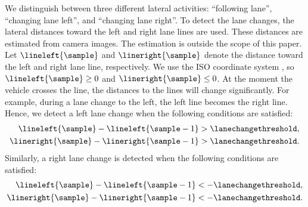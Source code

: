 We distinguish between three different lateral activities: ``following lane'', ``changing lane left'', and ``changing lane right''. 
To detect the lane changes, the lateral distances toward the left and right lane lines are used. 
These distances are estimated from camera images. 
The estimation is outside the scope of this paper. 
Let $\lineleft{\sample}$ and $\lineright{\sample}$ denote the distance toward the left and right lane line, respectively. 
\cstarta We use the ISO coordinate system \autocite{iso8855}, so $\lineleft{\sample} \geq 0$ and $\lineright{\sample} \leq 0$. At the moment the vehicle crosses the line, the distances to the lines will change significantly. For example, during a lane change to the left, the left line becomes the right line. Hence, we detect a left lane change when the following conditions are satisfied:
\begin{align}
	\lineleft{\sample} - \lineleft{\sample-1} &> \lanechangethreshold, \label{eq:potential left a} \\
	\lineright{\sample} - \lineright{\sample-1} &> \lanechangethreshold. \label{eq:potential left b}
\end{align}
Similarly, a right lane change is detected when the following conditions are satisfied:
\begin{align}
	\lineleft{\sample} - \lineleft{\sample-1} &< -\lanechangethreshold, \label{eq:potential right a}\\
	\lineright{\sample} - \lineright{\sample-1} &< -\lanechangethreshold. \label{eq:potential right b}
\end{align}

